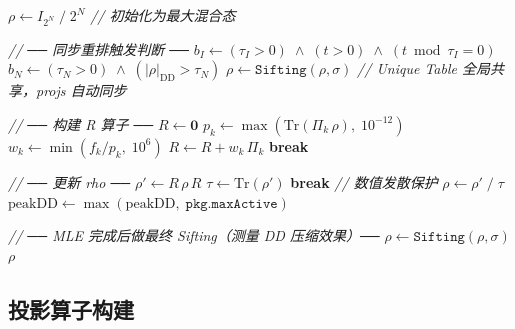\documentclass[12pt, a4paper]{article}
\begin{document}
\begin{algorithm}[H]
\caption{MLE-RhoR：$R\rho R$ 迭代算法（含同步重排）}
\begin{algorithmic}[1]

\State $\rho \leftarrow I_{2^N} \;/\; 2^N$
    \quad\textit{// 初始化为最大混合态}


    \State \textit{// ── 同步重排触发判断 ──}
    \State $b_I \leftarrow (\tau_I > 0) \;\wedge\; (t > 0) \;\wedge\; (t \bmod \tau_I = 0)$
    \State $b_N \leftarrow (\tau_N > 0) \;\wedge\; (|\rho|_{\mathrm{DD}} > \tau_N)$
        \State $\rho \leftarrow \texttt{Sifting}(\rho, \sigma)$
        \quad\textit{// Unique Table 全局共享，projs 自动同步}
    \EndIf

    \State \textit{// ── 构建 R 算子 ──}
    \State $R \leftarrow \mathbf{0}$
        \State $p_k \leftarrow \max\!\left(\mathrm{Tr}(\Pi_k\,\rho),\; 10^{-12}\right)$
        \State $w_k \leftarrow \min\!\left(f_k / p_k,\; 10^6\right)$
        \State $R \leftarrow R + w_k\,\Pi_k$
    \EndFor
     \textbf{break} \EndIf

    \State \textit{// ── 更新 rho ──}
    \State $\rho' \leftarrow R\,\rho\,R$
    \State $\tau \leftarrow \mathrm{Tr}(\rho')$
        \textbf{break}
        \quad\textit{// 数值发散保护}
    \EndIf
    \State $\rho \leftarrow \rho' \;/\; \tau$
    \State $\mathrm{peakDD} \leftarrow \max(\mathrm{peakDD},\; \texttt{pkg.maxActive})$

\EndFor

\State \textit{// ── MLE 完成后做最终 Sifting（测量 DD 压缩效果）──}
    \State $\rho \leftarrow \texttt{Sifting}(\rho, \sigma)$
\EndIf
\State \Return $\rho$
\end{algorithmic}
\end{algorithm}

\subsection{投影算子构建}
\end{document}
